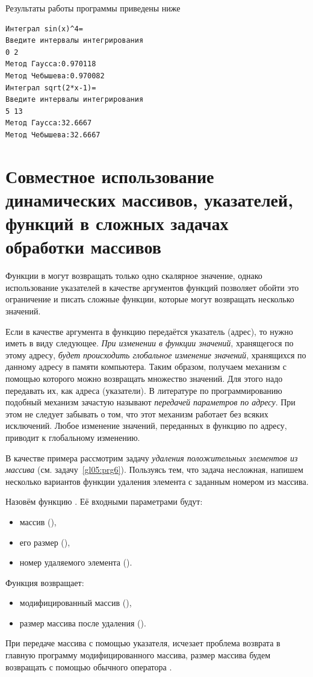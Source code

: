 Результаты работы программы приведены ниже
\begin{verbatim}
Интеграл sin(x)^4= 
Введите интервалы интегрирования 
0 2 
Метод Гаусса:0.970118 
Метод Чебышева:0.970082 
Интеграл sqrt(2*x-1)= 
Введите интервалы интегрирования 
5 13 
Метод Гаусса:32.6667 
Метод Чебышева:32.6667
\end{verbatim}

\section[Совместное использование динамических массивов]{Совместное использование динамических массивов, указателей, функций в сложных задачах обработки массивов}
Функции в  могут возвращать только одно скалярное значение, однако использование указателей в качестве аргументов
функций позволяет обойти это ограничение и писать сложные функции, которые могут возвращать несколько значений.

Если в качестве аргумента в функцию передаётся указатель (адрес), то нужно иметь в виду следующее. \emph{При
изменении в функции значений}, хранящегося по этому адресу, \emph{будет происходить глобальное изменение значений},
хранящихся по данному адресу в памяти компьютера. Таким образом, получаем механизм с помощью которого можно возвращать
множество значений. Для этого надо передавать их, как адреса (указатели). В литературе по программированию
подобный механизм зачастую называют \emph{передачей параметров по адресу}. При этом не следует забывать о том, что
этот механизм работает без всяких исключений. Любое изменение значений, переданных в функцию по адресу, приводит к
глобальному изменению.

В качестве примера рассмотрим задачу \emph{удаления положительных элементов из массива} (см. задачу~\ref{gl05:prg6}).
Пользуясь тем, что задача несложная, напишем несколько вариантов функции удаления элемента с заданным номером из
массива.

Назовём функцию . Её входными параметрами будут:

\begin{itemize}
\item массив (),
\item его размер (),
\item номер удаляемого элемента ().
\end{itemize}
Функция возвращает:

\begin{itemize}
\item модифицированный массив (),
\item размер массива после удаления ().
\end{itemize}
При передаче массива с помощью указателя, исчезает проблема возврата в главную программу модифицированного массива,
размер массива будем возвращать с помощью обычного оператора .

